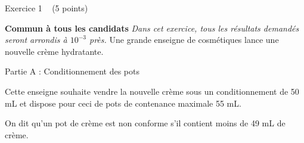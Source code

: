 
%
\begin{h2}Exercice 1   (5 points)\end{h2}
\textbf{Commun  à tous les candidats}
\textit{Dans cet exercice, tous les résultats demandés seront arrondis à $10^{-3}$ près.}
Une grande enseigne de cosmétiques lance une nouvelle crème hydratante.
\begin{h3}Partie A : Conditionnement des pots\end{h3}
Cette enseigne souhaite vendre la nouvelle crème sous un conditionnement de 50 mL et dispose pour ceci de pots de contenance maximale 55 mL.
\par
On dit qu'un pot de crème est non conforme s'il contient moins de 49 mL de crème.
